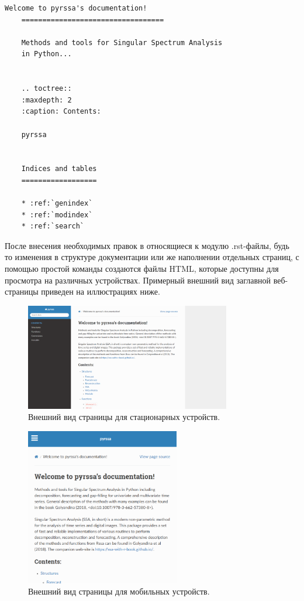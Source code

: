 \documentclass[specialist,
			   substylefile = spbu_report.rtx,
			   subf,href,colorlinks=true, 12pt]{disser}
\begin{document}
\begin{lstlisting}[language=RsT, caption=Содержимое файла заглавной страницы документации.]
	Welcome to pyrssa's documentation!
	==================================
	
	Methods and tools for Singular Spectrum Analysis
	in Python...

	
	.. toctree::
	:maxdepth: 2
	:caption: Contents:
	
	pyrssa
	
	
	Indices and tables
	==================
	
	* :ref:`genindex`
	* :ref:`modindex`
	* :ref:`search`
\end{lstlisting}
	
После внесения необходимых правок в относящиеся к модулю .rst-файлы, будь то изменения в структуре документации или же наполнении отдельных страниц, с помощью простой команды создаются файлы HTML, которые доступны для просмотра на различных устройствах. Примерный внешний вид заглавной веб-страницы приведен на иллюстрациях ниже.

\begin{figure}[H]
	\centering
	\includegraphics[width=0.8\textwidth]{index_page_pc}
	\caption{Внешний вид страницы для стационарных устройств.}
	\label{fig:index_page_pc}
\end{figure}

\begin{figure}[H]
	\centering
	\includegraphics[width=0.6\textwidth]{index_page_mobile}
	\caption{Внешний вид страницы для мобильных устройств.}
	\label{fig:index_page_mobile}
\end{figure}
\end{document}
